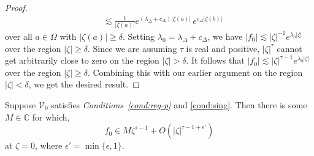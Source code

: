\documentclass[final]{siamart220329}
\newcommand{\C}{\mathbb{C}}
\newcommand{\hardpart}{\mathcal{V}_0}
\newcommand{\solproto}{f_0}
\newcommand{\domain}{\Omega}
\begin{document}
\begin{proof}
\begin{align*}
& \lesssim \frac{1}{|\zeta(a)|} e^{(\lambda_\Delta + c_\Delta)|\zeta(a)|}\,e^{c_\Delta|\zeta(b)|}
\end{align*}
over all $a \in \domain$ with $|\zeta(a)| \ge \delta$. Setting $\lambda_0 = \lambda_\Delta + c_\Delta$, we have $|\solproto| \lesssim |\zeta|^{-1} e^{\lambda_0|\zeta|}$ over the region $|\zeta| \ge \delta$. Since we are assuming $\tau$ is real and positive, $|\zeta|^\tau$ cannot get arbitrarily close to zero on the region $|\zeta| > \delta$. It follows that $|\solproto| \lesssim |\zeta|^{\tau-1} e^{\lambda_0|\zeta|}$ over the region $|\zeta| \ge \delta$. Combining this with our earlier argument on the region $|\zeta| < \delta$, we get the desired result.
\end{proof}
\begin{proposition}\label{prop:better-proto-estimate}
Suppose $\hardpart$ satisfies {\em Conditions~\eqref{cond:reg-p}} and \eqref{cond:sing}. Then there is some $M\in\C$ for which,
\[ \solproto \in M\zeta^{\tau-1} + O(|\zeta|^{\tau-1+\epsilon'}) \]
at $\zeta = 0$, where $\epsilon'=\min\{\epsilon, 1\}$.
\end{proposition}
\end{document}
